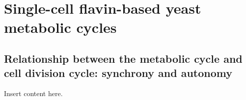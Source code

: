 \chapter{Single-cell flavin-based yeast metabolic cycles}

\section{Relationship between the metabolic cycle and cell division cycle: synchrony and autonomy}

Insert content here.
